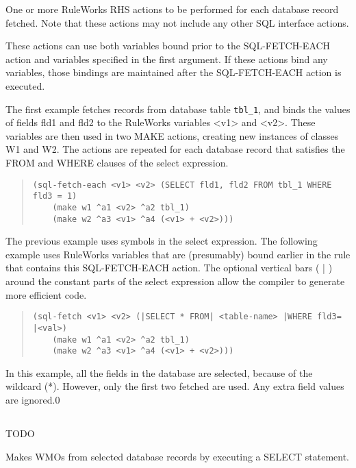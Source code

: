 {{One or more RuleWorks RHS actions to be performed for each
database record fetched. Note that these actions may not
include any other SQL interface actions.

These actions can use both variables bound prior to the
SQL-FETCH-EACH action and variables specified in the first
argument. If these actions bind any variables, those bindings
are maintained after the SQL-FETCH-EACH action is executed.

\Example

The first example fetches records from database table \verb|tbl_1|,
and binds the values of fields fld1 and fld2 to the RuleWorks
variables <v1> and <v2>. These variables are then used in two
MAKE actions, creating new instances of classes W1 and W2.
The actions are repeated for each database record that
satisfies the FROM and WHERE clauses of the select
expression.

\begin{quote}
\begin{verbatim}
(sql-fetch-each <v1> <v2> (SELECT fld1, fld2 FROM tbl_1 WHERE fld3 = 1)
    (make w1 ^a1 <v2> ^a2 tbl_1)
    (make w2 ^a3 <v1> ^a4 (<v1> + <v2>)))
\end{verbatim}
\end{quote}

The previous example uses symbols in the select expression.
The following example uses RuleWorks variables that are
(presumably) bound earlier in the rule that contains this
SQL-FETCH-EACH action. The optional vertical bars ( | )
around the constant parts of the select expression allow the
compiler to generate more efficient code.
\begin{quote}
\begin{verbatim}
(sql-fetch <v1> <v2> (|SELECT * FROM| <table-name> |WHERE fld3= |<val>)
    (make w1 ^a1 <v2> ^a2 tbl_1)
    (make w2 ^a3 <v1> ^a4 (<v1> + <v2>)))
\end{verbatim}
\end{quote}

In this example, all the fields in the database are selected,
because of the wildcard (*). However, only the first two
fetched are used. Any extra field values are ignored.0

\subsection{}
TODO

Makes WMOs from selected database records by executing a
SELECT statement.

}}
